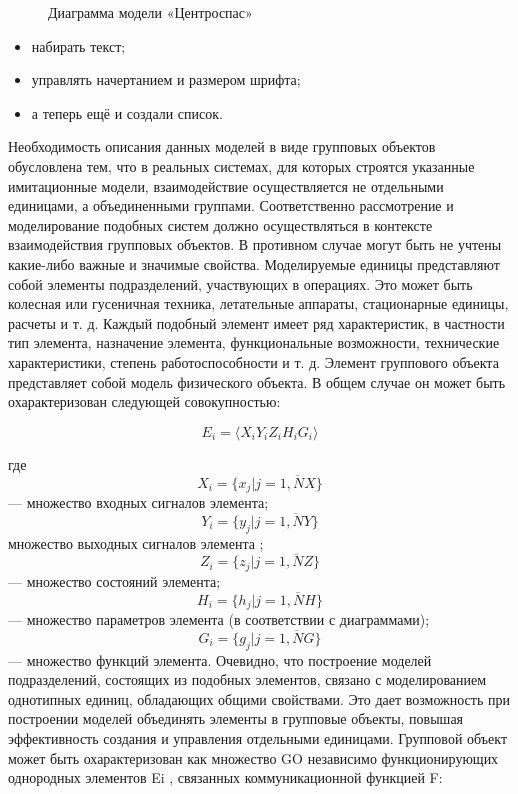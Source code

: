 \documentclass[12pt]{article}
\begin{document}
\begin{figure}[h]
\caption{Диаграмма модели «Центроспас»}
\end{figure}
\begin{itemize}
\item набирать текст;
\item управлять начертанием и размером шрифта;
\item а теперь ещё и создали список.
\end{itemize}


Необходимость описания данных моделей в виде
групповых объектов обусловлена тем, что в реальных
системах, для которых строятся указанные имитационные модели, взаимодействие осуществляется не отдельными единицами, а объединенными группами. Соответственно рассмотрение и моделирование подобных
систем должно осуществляться в контексте взаимодействия групповых объектов. В противном случае могут
быть не учтены какие-либо важные и значимые
свойства.
Моделируемые единицы представляют собой элементы подразделений, участвующих в операциях. Это
может быть колесная или гусеничная техника, летательные аппараты, стационарные единицы, расчеты
и т. д. Каждый подобный элемент имеет ряд характеристик, в частности тип элемента, назначение элемента,
функциональные возможности, технические характеристики, степень работоспособности и т. д. Элемент
группового объекта представляет собой модель физического объекта. В общем случае он может быть охарактеризован следующей совокупностью:

\[E_{i}=\langle X_{i}Y_{i}Z_{i} H_{i}G_{i} \rangle \]

 где
\[X_{i}=\{ x_{j}|j = \overline{1,NX}\}\]
 — множество входных сигналов элемента;
\[Y_{i}=\{ y_{j}|j = \overline{1,NY}\}\]
множество выходных сигналов элемента ;
\[Z_{i}=\{ z_{j}|j = \overline{1,NZ}\}\]
 — множество состояний элемента;
\[H_{i}=\{ h_{j}|j = \overline{1,NH}\}\]
 — множество параметров элемента
(в соответствии с диаграммами); 
\[G_{i}=\{ g_{j}|j = \overline{1,NG}\}\]
— множество функций элемента.
Очевидно, что построение моделей подразделений,
состоящих из подобных элементов, связано с моделированием однотипных единиц, обладающих общими
свойствами. Это дает возможность при построении моделей объединять элементы в групповые объекты, повышая эффективность создания и управления отдельными единицами.
Групповой объект может быть охарактеризован как
множество GO независимо функционирующих однородных элементов Ei
, связанных коммуникационной
функцией F:
\end{document}
